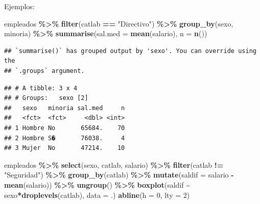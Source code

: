 \documentclass[
]{book}
\newenvironment{Shaded}{\begin{snugshade}}{\end{snugshade}}
\newcommand{\AttributeTok}[1]{\textcolor[rgb]{0.13,0.29,0.53}{#1}}
\newcommand{\DecValTok}[1]{\textcolor[rgb]{0.00,0.00,0.81}{#1}}
\newcommand{\FunctionTok}[1]{\textcolor[rgb]{0.13,0.29,0.53}{\textbf{#1}}}
\newcommand{\NormalTok}[1]{#1}
\newcommand{\SpecialCharTok}[1]{\textcolor[rgb]{0.81,0.36,0.00}{\textbf{#1}}}
\newcommand{\StringTok}[1]{\textcolor[rgb]{0.31,0.60,0.02}{#1}}
\begin{document}
Ejemplos:

\begin{Shaded}
\begin{Highlighting}[]
\NormalTok{empleados }\SpecialCharTok{\%\textgreater{}\%}  \FunctionTok{filter}\NormalTok{(catlab }\SpecialCharTok{==} \StringTok{"Directivo"}\NormalTok{) }\SpecialCharTok{\%\textgreater{}\%}
          \FunctionTok{group\_by}\NormalTok{(sexo, minoria) }\SpecialCharTok{\%\textgreater{}\%}
          \FunctionTok{summarise}\NormalTok{(}\AttributeTok{sal.med =} \FunctionTok{mean}\NormalTok{(salario), }\AttributeTok{n =} \FunctionTok{n}\NormalTok{())}
\end{Highlighting}
\end{Shaded}

\begin{verbatim}
## `summarise()` has grouped output by 'sexo'. You can override using the
## `.groups` argument.
\end{verbatim}

\begin{verbatim}
## # A tibble: 3 x 4
## # Groups:   sexo [2]
##   sexo   minoria sal.med     n
##   <fct>  <fct>     <dbl> <int>
## 1 Hombre No       65684.    70
## 2 Hombre S�       76038.     4
## 3 Mujer  No       47214.    10
\end{verbatim}

\begin{Shaded}
\begin{Highlighting}[]
\NormalTok{empleados }\SpecialCharTok{\%\textgreater{}\%} \FunctionTok{select}\NormalTok{(sexo, catlab, salario) }\SpecialCharTok{\%\textgreater{}\%}
          \FunctionTok{filter}\NormalTok{(catlab }\SpecialCharTok{!=} \StringTok{"Seguridad"}\NormalTok{) }\SpecialCharTok{\%\textgreater{}\%}
          \FunctionTok{group\_by}\NormalTok{(catlab) }\SpecialCharTok{\%\textgreater{}\%}
          \FunctionTok{mutate}\NormalTok{(}\AttributeTok{saldif =}\NormalTok{ salario }\SpecialCharTok{{-}} \FunctionTok{mean}\NormalTok{(salario)) }\SpecialCharTok{\%\textgreater{}\%}
          \FunctionTok{ungroup}\NormalTok{() }\SpecialCharTok{\%\textgreater{}\%}
          \FunctionTok{boxplot}\NormalTok{(saldif }\SpecialCharTok{\textasciitilde{}}\NormalTok{ sexo}\SpecialCharTok{*}\FunctionTok{droplevels}\NormalTok{(catlab), }\AttributeTok{data =}\NormalTok{ .)}
\FunctionTok{abline}\NormalTok{(}\AttributeTok{h =} \DecValTok{0}\NormalTok{, }\AttributeTok{lty =} \DecValTok{2}\NormalTok{)}
\end{Highlighting}
\end{Shaded}
\end{document}
